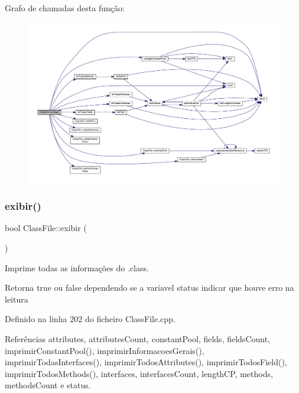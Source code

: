 Grafo de chamadas desta função\+:
\nopagebreak
\begin{figure}[H]
\begin{center}
\leavevmode
\includegraphics[width=350pt]{classClassFile_a619e102ada15202ab84981d43362a3e9_cgraph}
\end{center}
\end{figure}
\mbox{\label{classClassFile_a7da7cc6de8de3fc6f27faf3b76f4883a}} 
\subsubsection{\texorpdfstring{exibir()}{exibir()}}
{\footnotesize\ttfamily bool Class\+File\+::exibir (\begin{DoxyParamCaption}{ }\end{DoxyParamCaption})}



Imprime todas as informações do .class. 

\begin{DoxyReturn}{Retorna}
true ou false dependendo se a variavel status indicar que houve erro na leitura 
\end{DoxyReturn}


Definido na linha 202 do ficheiro Class\+File.\+cpp.



Referências attributes, attributes\+Count, constant\+Pool, fields, fields\+Count, imprimir\+Constant\+Pool(), imprimir\+Informacoes\+Gerais(), imprimir\+Todas\+Interfaces(), imprimir\+Todos\+Attributes(), imprimir\+Todos\+Field(), imprimir\+Todos\+Methods(), interfaces, interfaces\+Count, length\+CP, methods, methods\+Count e status.



